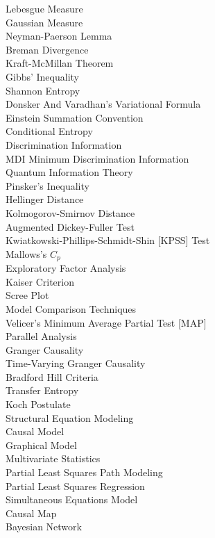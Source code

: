 Lebesgue Measure \\
Gaussian Measure \\
Neyman-Paerson Lemma \\
Breman Divergence \\
Kraft-McMillan Theorem \\
Gibbs' Inequality \\
Shannon Entropy \\
Donsker And Varadhan's Variational Formula \\
Einstein Summation Convention \\
Conditional Entropy \\
Discrimination Information \\
MDI Minimum Discrimination Information \\
Quantum Information Theory \\
Pinsker's Inequality \\
Hellinger Distance \\
Kolmogorov-Smirnov Distance \\
Augmented Dickey-Fuller Test \\
Kwiatkowski-Phillips-Schmidt-Shin [KPSS] Test \\
Mallows's $C_p$ \\
Exploratory Factor Analysis \\
Kaiser Criterion \\
Scree Plot \\
Model Comparison Techniques \\
Velicer's Minimum Average Partial Test [MAP] \\
Parallel Analysis \\
Granger Causality \\
Time-Varying Granger Causality \\
Bradford Hill Criteria \\
Transfer Entropy \\
Koch Postulate \\
Structural Equation Modeling \\
Causal Model \\
Graphical Model \\
Multivariate Statistics \\
Partial Least Squares Path Modeling \\
Partial Least Squares Regression \\
Simultaneous Equations Model \\
Causal Map \\
Bayesian Network \\
